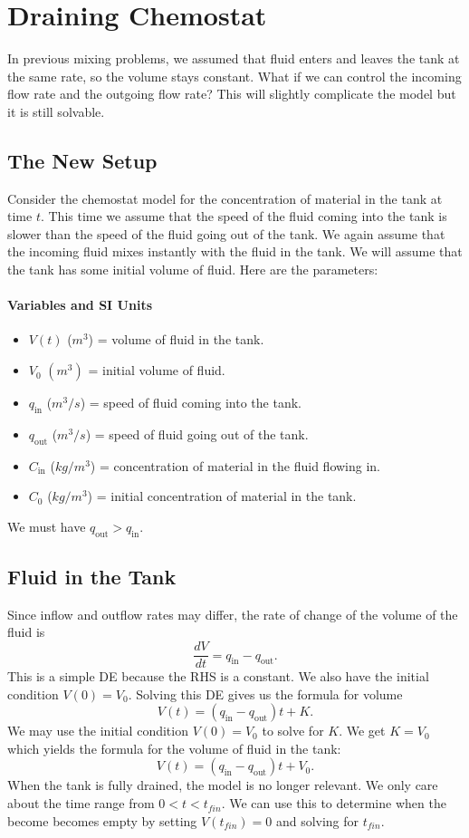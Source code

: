 \documentclass[09pt,letterpaper]{article}
\begin{document}
\section{Draining Chemostat}
In previous mixing problems, we assumed that fluid enters and leaves the tank at the same rate, so the volume stays constant. What if we can control the incoming flow rate and the outgoing flow rate? This will slightly complicate the model but it is still solvable.

\subsection*{The New Setup}
Consider the chemostat model for the concentration of material in the tank at time $t$. This time we assume that the speed of the fluid coming into the tank is slower than the speed of the fluid going out of the tank. We again assume that the incoming fluid mixes instantly with the fluid in the tank. We will assume that the tank has some initial volume of fluid. Here are the parameters:
\paragraph{Variables and SI Units}
\begin{itemize}
    \item $V(t)$ ($m^3$) = volume of fluid in the tank.
    \item $V_0$  $(m^3)$ = initial volume of fluid. 
    \item $q_{\text{in}}$ ($m^3/s$) = speed of fluid coming into the tank.
    \item $q_{\text{out}}$ ($m^3/s$) = speed of fluid going out of the tank.
    \item $C_{\text{in}}$ ($kg/m^3$)  = concentration of material in the fluid flowing in.
    \item $C_{0}$ ($kg/m^3$)  = initial concentration of material in the tank.
\end{itemize}
We must have $q_{\text{out}} > q_{\text{in}}$.

\subsection*{Fluid in the Tank}
Since inflow and outflow rates may differ, the rate of change of the volume of the fluid is 
$$
\frac{dV}{dt} = q_{\text{in}} - q_{\text{out}}.
$$
This is a simple DE because the RHS is a constant. We also have the initial condition $V(0)= V_0$. Solving this DE gives us the formula for volume
\[
V(t) = (q_{\text{in}} - q_{\text{out}})t +K.
\]
We may use the initial condition $V(0)=V_0$ to solve for $K$. We get $K=V_0$ which yields the formula for the volume of fluid in the tank:
\[
V(t) = (q_{\text{in}} - q_{\text{out}})t +V_0.
\]
When the tank is fully drained, the model is no longer relevant. We only care about the time range from $0<t<t_{fin}$. We can use this to determine when the become becomes empty by setting $V(t_{fin})=0$ and solving for $t_{fin}$. 
\end{document}
